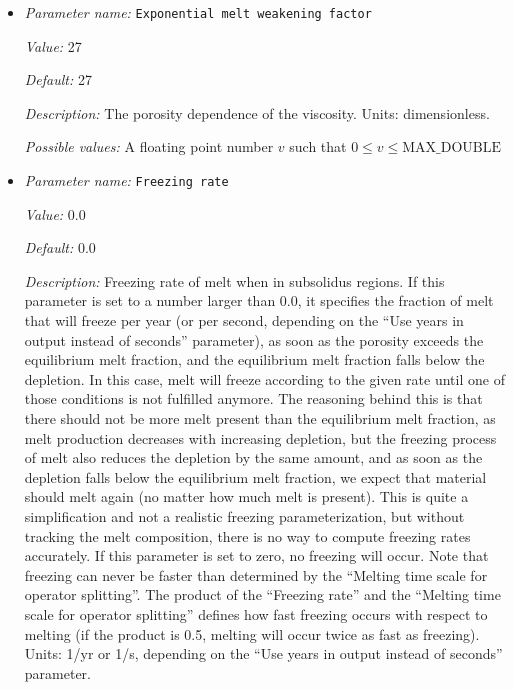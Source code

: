\begin{itemize}
{\it Possible values:} A floating point number $v$ such that $0 \leq v \leq \text{MAX\_DOUBLE}$
\item {\it Parameter name:} {\tt Exponential melt weakening factor}
\label{parameters:Material model/Melt simple/Exponential melt weakening factor}


{\it Value:} 27


{\it Default:} 27


{\it Description:} The porosity dependence of the viscosity. Units: dimensionless.


{\it Possible values:} A floating point number $v$ such that $0 \leq v \leq \text{MAX\_DOUBLE}$
\item {\it Parameter name:} {\tt Freezing rate}
\label{parameters:Material model/Melt simple/Freezing rate}


{\it Value:} 0.0


{\it Default:} 0.0


{\it Description:} Freezing rate of melt when in subsolidus regions. If this parameter is set to a number larger than 0.0, it specifies the fraction of melt that will freeze per year (or per second, depending on the ``Use years in output instead of seconds'' parameter), as soon as the porosity exceeds the equilibrium melt fraction, and the equilibrium melt fraction falls below the depletion. In this case, melt will freeze according to the given rate until one of those conditions is not fulfilled anymore. The reasoning behind this is that there should not be more melt present than the equilibrium melt fraction, as melt production decreases with increasing depletion, but the freezing process of melt also reduces the depletion by the same amount, and as soon as the depletion falls below the equilibrium melt fraction, we expect that material should melt again (no matter how much melt is present). This is quite a simplification and not a realistic freezing parameterization, but without tracking the melt composition, there is no way to compute freezing rates accurately. If this parameter is set to zero, no freezing will occur. Note that freezing can never be faster than determined by the ``Melting time scale for operator splitting''. The product of the ``Freezing rate'' and the ``Melting time scale for operator splitting'' defines how fast freezing occurs with respect to melting (if the product is 0.5, melting will occur twice as fast as freezing). Units: 1/yr or 1/s, depending on the ``Use years in output instead of seconds'' parameter.



\end{itemize}
